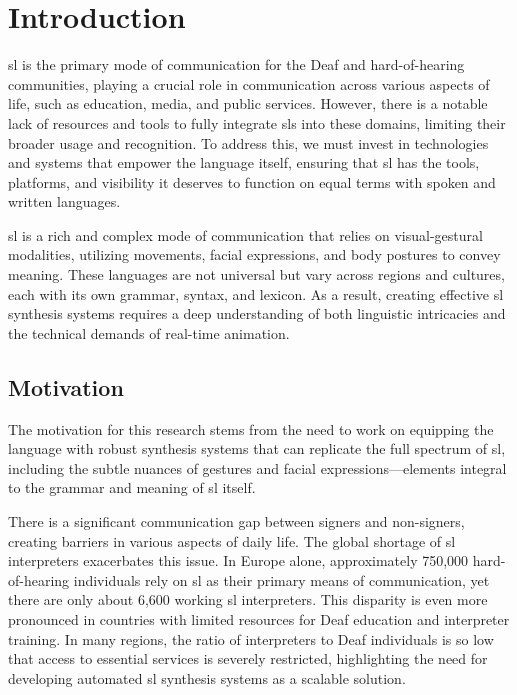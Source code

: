 \documentclass[../../main.tex]{subfiles}
\begin{document}
\chapter{Introduction}
\label{ch:introduction}

\gls{sl} is the primary mode of communication for the Deaf and hard-of-hearing communities, playing a crucial role in communication across various aspects of life, such as education, media, and public services. However, there is a notable lack of resources and tools to fully integrate \gls{sl}s into these domains, limiting their broader usage and recognition. To address this, we must invest in technologies and systems that empower the language itself, ensuring that \gls{sl} has the tools, platforms, and visibility it deserves to function on equal terms with spoken and written languages.

\gls{sl} is a rich and complex mode of communication that relies on visual-gestural modalities, utilizing movements, facial expressions, and body postures to convey meaning. These languages are not universal but vary across regions and cultures, each with its own grammar, syntax, and lexicon. As a result, creating effective \gls{sl} synthesis systems requires a deep understanding of both linguistic intricacies and the technical demands of real-time animation.

\section{Motivation}
\label{ch:introduction:motivation}

The motivation for this research stems from the need to work on equipping the language with robust synthesis systems that can replicate the full spectrum of \gls{sl}, including the subtle nuances of gestures and facial expressions—elements integral to the grammar and meaning of \gls{sl} itself.

There is a significant communication gap between signers and non-signers, creating barriers in various aspects of daily life. The global shortage of \gls{sl} interpreters exacerbates this issue. In Europe alone, approximately 750,000 hard-of-hearing individuals rely on \gls{sl} as their primary means of communication, yet there are only about 6,600 working \gls{sl} interpreters. This disparity is even more pronounced in countries with limited resources for Deaf education and interpreter training. In many regions, the ratio of interpreters to Deaf individuals is so low that access to essential services is severely restricted, highlighting the need for developing automated \gls{sl} synthesis systems as a scalable solution.
\end{document}
